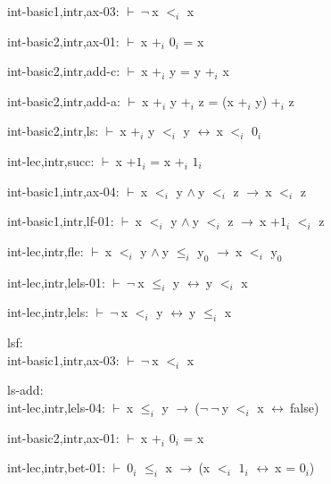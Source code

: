 \documentclass[a4paper]{article}
\newcommand{\Fol}{\mbox{$\vdash\ $}}
\newcommand{\Not}{\mbox{$\neg\ $}}
\newcommand{\And}{\mbox{$\wedge\ $}}
\newcommand{\Imp}{\mbox{$\rightarrow\ $}}
\newcommand{\Equiv}{\mbox{$\leftrightarrow\ $}}
\begin{document}
int-basic1,intr,ax-03: 
 \Fol \Not x $\mbox{$<$}_{i}$ x



int-basic2,intr,ax-01: 
 \Fol x $\mbox{+}_{i}$ $\mbox{0}_{i}$ = x



int-basic2,intr,add-c: 
 \Fol x $\mbox{+}_{i}$ y = y $\mbox{+}_{i}$ x



int-basic2,intr,add-a: 
 \Fol x $\mbox{+}_{i}$ y $\mbox{+}_{i}$ z = (x $\mbox{+}_{i}$ y) $\mbox{+}_{i}$ z



int-basic2,intr,ls: 
 \Fol x $\mbox{+}_{i}$ y $\mbox{$<$}_{i}$ y \Equiv x $\mbox{$<$}_{i}$ $\mbox{0}_{i}$



int-lec,intr,succ: 
 \Fol x $\mbox{+1}_{i}$ = x $\mbox{+}_{i}$ $\mbox{1}_{i}$



int-basic1,intr,ax-04: 
 \Fol x $\mbox{$<$}_{i}$ y \And y $\mbox{$<$}_{i}$ z \Imp x $\mbox{$<$}_{i}$ z



int-basic1,intr,lf-01: 
 \Fol x $\mbox{$<$}_{i}$ y \And y $\mbox{$<$}_{i}$ z \Imp x $\mbox{+1}_{i}$ $\mbox{$<$}_{i}$ z



int-lec,intr,fle: 
 \Fol x $\mbox{$<$}_{i}$ y \And y $\mbox{$\le$}_{i}$ $\mbox{y}_{0}$ \Imp x $\mbox{$<$}_{i}$ $\mbox{y}_{0}$



int-lec,intr,lels-01: 
 \Fol \Not x $\mbox{$\le$}_{i}$ y \Equiv y $\mbox{$<$}_{i}$ x



int-lec,intr,lels: 
 \Fol \Not x $\mbox{$<$}_{i}$ y \Equiv y $\mbox{$\le$}_{i}$ x



\bigskip

lsf:\\ int-basic1,intr,ax-03: 
 \Fol \Not x $\mbox{$<$}_{i}$ x



\bigskip

ls-add:\\ int-lec,intr,lels-04: 
 \Fol x $\mbox{$\le$}_{i}$ y \Imp (\Not \Not y $\mbox{$<$}_{i}$ x \Equiv false)



int-basic2,intr,ax-01: 
 \Fol x $\mbox{+}_{i}$ $\mbox{0}_{i}$ = x



int-lec,intr,bet-01: 
 \Fol $\mbox{0}_{i}$ $\mbox{$\le$}_{i}$ x \Imp (x $\mbox{$<$}_{i}$ $\mbox{1}_{i}$ \Equiv x = $\mbox{0}_{i}$)
\end{document}
